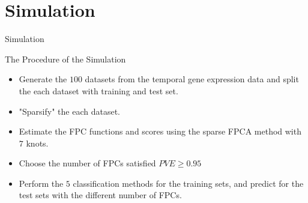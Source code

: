 \documentclass{beamer}
\begin{document}
\section{Simulation}
\begin{frame}{Simulation}
	\begin{block}{The Procedure of the Simulation}
		\vspace{0.1cm}
		\begin{itemize}
			\item {
				Generate the $100$ datasets from the temporal gene expression data and 
				split the each dataset with training and test set.
			}
			\item {
				"Sparsify" the each dataset.
			}		
			\item {
				Estimate the FPC functions and scores using the sparse FPCA method with $7$ knots.
			}
			\item {
				Choose the number of FPCs satisfied $PVE \ge 0.95$
			}		
			\item {
				Perform the $5$ classification methods for the training sets, and predict for the test sets with the different number of FPCs.
			}
		\end{itemize}
	\end{block}
\end{frame}
\end{document}
